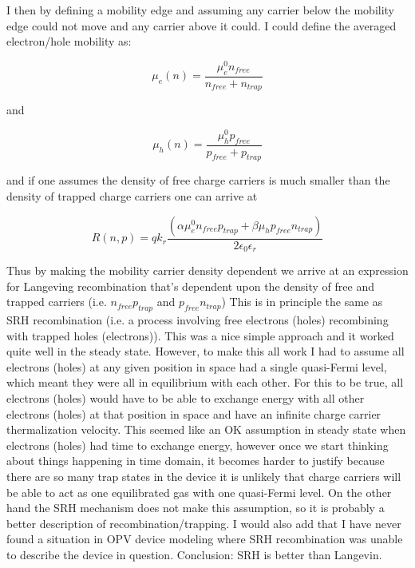 I then by defining a mobility edge and assuming any carrier below the mobility edge could not move and any carrier above it could.  I could define the averaged electron/hole mobility as: 

\begin{equation}
\mu_e(n)=\frac{\mu_e^0 n_{free}}{n_{free}+n_{trap}}
\end{equation}

and

\begin{equation}
\mu_h(n)=\frac{\mu_h^0 p_{free}}{p_{free}+p_{trap}}
\end{equation}

and if one assumes the density of free charge carriers is much smaller than the density of trapped charge carriers one can arrive at

\begin{equation}
R(n,p)=q k_{r}\frac{(\alpha \mu_e^0 n_{free} p_{trap}+\beta \mu_h p_{free} n_{trap}) }{2\epsilon_0\epsilon_r}
\end{equation}

Thus by making the mobility carrier density dependent we arrive at an expression for Langeving recombination that's dependent upon the density of free and trapped carriers (i.e. $n_{free} p_{trap}$ and $ p_{free} n_{trap}$) This is in principle the same as SRH recombination (i.e. a process involving free electrons (holes) recombining with trapped holes (electrons)).  This was a nice simple approach and it worked quite well in the steady state.  However, to make this all work I had to assume all electrons (holes) at any given position in space had a single quasi-Fermi level, which meant they were all in equilibrium with each other.  For this to be true, all electrons (holes) would have to be able to exchange energy with all other electrons (holes) at that position in space and have an infinite charge carrier thermalization velocity.  This seemed like an OK assumption in steady state when electrons (holes) had time to exchange energy, however once we start thinking about things happening in time domain, it becomes harder to justify because there are so many trap states in the device it is unlikely that charge carriers will be able to act as one equilibrated gas with one quasi-Fermi level.  On the other hand the SRH mechanism does not make this assumption, so it is probably a better description of recombination/trapping.  I would also add that I have never found a situation in OPV device modeling where SRH recombination was unable to describe the device in question.  Conclusion: SRH is better than Langevin.  


